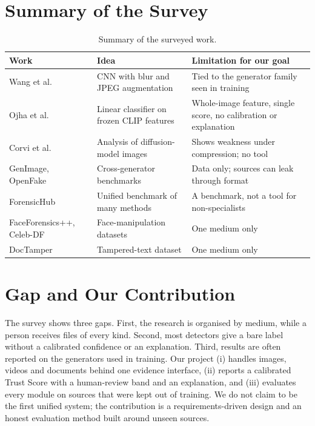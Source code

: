 \section{Summary of the Survey}
\begin{table}[htbp]
\centering\small
\caption{Summary of the surveyed work.}
\begin{tabularx}{\linewidth}{@{}p{2.3cm}X X@{}}
\toprule
Work & Idea & Limitation for our goal\\
\midrule
Wang et al. \cite{wang} & CNN with blur and JPEG augmentation & Tied to the generator family seen in training\\
Ojha et al. \cite{ojha} & Linear classifier on frozen CLIP features & Whole-image feature, single score, no calibration or explanation\\
Corvi et al. \cite{corvi} & Analysis of diffusion-model images & Shows weakness under compression; no tool\\
GenImage, OpenFake \cite{genimage,openfake} & Cross-generator benchmarks & Data only; sources can leak through format \cite{grommelt}\\
ForensicHub \cite{forensichub} & Unified benchmark of many methods & A benchmark, not a tool for non-specialists\\
FaceForensics++, Celeb-DF \cite{rossler,celebdf} & Face-manipulation datasets & One medium only\\
DocTamper \cite{doctamper} & Tampered-text dataset & One medium only\\
\bottomrule
\end{tabularx}
\end{table}

\section{Gap and Our Contribution}
The survey shows three gaps. First, the research is organised by medium, while a person receives files of every kind. Second, most detectors give a bare label without a calibrated confidence or an explanation. Third, results are often reported on the generators used in training. Our project (i) handles images, videos and documents behind one evidence interface, (ii) reports a calibrated Trust Score with a human-review band and an explanation, and (iii) evaluates every module on sources that were kept out of training. We do not claim to be the first unified system; the contribution is a requirements-driven design and an honest evaluation method built around unseen sources.
